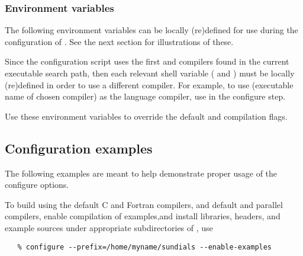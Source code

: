 \subsubsection*{Environment variables}


\noindent The following environment variables can be locally (re)defined for use 
during the configuration of {\sundials}. See the next section for
illustrations of these.

\begin{config}

\item {}

\item {}

  Since the configuration script uses the first {\C} and {\F} compilers found in
  the current executable search path, then each relevant shell variable (
  and ) must be locally (re)defined in order to use a different compiler. 
  For example, to use  (executable name of chosen compiler) as the {\C}
  language compiler, use  in the configure step.

\item {}

\item {}

  Use these environment variables to override the default {\C} and {\F}
  compilation flags.

\end{config}




\subsection{Configuration examples}

The following examples are meant to help demonstrate proper usage of the configure options.


To build {\sundials} using the default C and Fortran compilers,
and default  and  parallel compilers, 
enable compilation of examples,and install libraries, headers, and
example sources under appropriate subdirectories of
, use
\begin{verbatim}
   % configure --prefix=/home/myname/sundials --enable-examples
\end{verbatim}


